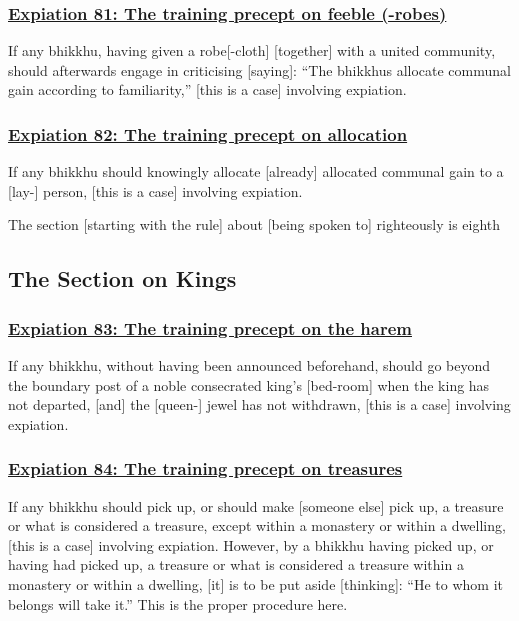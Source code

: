 \subsubsection*{\hyperref[pac81]{Expiation 81: The training precept on feeble (-robes)}}
\label{exp81}
If any bhikkhu, having given a robe[-cloth] [together] with a united community, should afterwards engage in criticising [saying]: ``The bhikkhus allocate communal gain according to familiarity,'' [this is a case] involving expiation.



\subsubsection*{\hyperref[pac82]{Expiation 82: The training precept on allocation}}
\label{exp82}
If any bhikkhu should knowingly allocate [already] allocated communal gain to a [lay-] person, [this is a case] involving expiation.

\begin{center}
	The section [starting with the rule] about [being spoken to] righteously is eighth
\end{center}



\setsubsecheadstyle{\subsectionFmt}
\subsection{The Section on Kings}

\subsubsection*{\hyperref[pac83]{Expiation 83: The training precept on the harem}}
\label{exp83}
If any bhikkhu, without having been announced beforehand, should go beyond the boundary post of a noble consecrated king's [bed-room] when the king has not departed, [and] the [queen-] jewel has not withdrawn, [this is a case] involving expiation.



\subsubsection*{\hyperref[pac84]{Expiation 84: The training precept on treasures}}
\label{exp84}
If any bhikkhu should pick up, or should make [someone else] pick up, a treasure or what is considered a treasure, except within a monastery or within a dwelling, [this is a case] involving expiation. However, by a bhikkhu having picked up, or having had picked up, a treasure or what is considered a treasure within a monastery or within a dwelling, [it] is to be put aside [thinking]: ``He to whom it belongs will take it.'' This is the proper procedure here.




